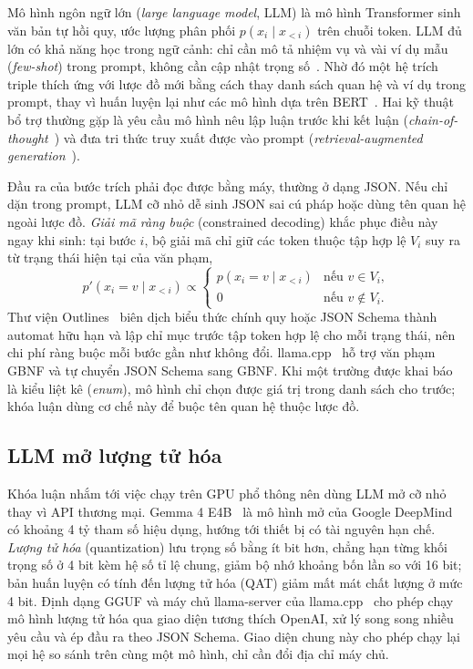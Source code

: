 Mô hình ngôn ngữ lớn (\textit{large language model}, LLM) là mô hình Transformer sinh văn bản tự hồi quy, ước lượng phân phối $p(x_i \mid x_{<i})$ trên chuỗi token.
LLM đủ lớn có khả năng học trong ngữ cảnh: chỉ cần mô tả nhiệm vụ và vài ví dụ mẫu (\textit{few-shot}) trong prompt, không cần cập nhật trọng số~\cite{brown2020gpt3}.
Nhờ đó một hệ trích triple thích ứng với lược đồ mới bằng cách thay danh sách quan hệ và ví dụ trong prompt, thay vì huấn luyện lại như các mô hình dựa trên BERT~\cite{devlin2019bert}.
Hai kỹ thuật bổ trợ thường gặp là yêu cầu mô hình nêu lập luận trước khi kết luận (\textit{chain-of-thought}~\cite{wei2022cot}) và đưa tri thức truy xuất được vào prompt (\textit{retrieval-augmented generation}~\cite{lewis2020rag}).

Đầu ra của bước trích phải đọc được bằng máy, thường ở dạng JSON.
Nếu chỉ dặn trong prompt, LLM cỡ nhỏ dễ sinh JSON sai cú pháp hoặc dùng tên quan hệ ngoài lược đồ.
\textit{Giải mã ràng buộc} (constrained decoding) khắc phục điều này ngay khi sinh: tại bước $i$, bộ giải mã chỉ giữ các token thuộc tập hợp lệ $V_i$ suy ra từ trạng thái hiện tại của văn phạm,
\begin{equation}
  p'(x_i = v \mid x_{<i}) \propto
  \begin{cases}
    p(x_i = v \mid x_{<i}) & \text{nếu } v \in V_i,\\
    0 & \text{nếu } v \notin V_i.
  \end{cases}
\end{equation}
Thư viện Outlines~\cite{willard2023outlines} biên dịch biểu thức chính quy hoặc JSON Schema thành automat hữu hạn và lập chỉ mục trước tập token hợp lệ cho mỗi trạng thái, nên chi phí ràng buộc mỗi bước gần như không đổi.
llama.cpp~\cite{llamacpp} hỗ trợ văn phạm GBNF và tự chuyển JSON Schema sang GBNF.
Khi một trường được khai báo là kiểu liệt kê (\textit{enum}), mô hình chỉ chọn được giá trị trong danh sách cho trước; khóa luận dùng cơ chế này để buộc tên quan hệ thuộc lược đồ.

\subsection{LLM mở lượng tử hóa}

Khóa luận nhắm tới việc chạy trên GPU phổ thông nên dùng LLM mở cỡ nhỏ thay vì API thương mại.
Gemma 4 E4B~\cite{gemma4} là mô hình mở của Google DeepMind có khoảng 4 tỷ tham số hiệu dụng, hướng tới thiết bị có tài nguyên hạn chế.
\textit{Lượng tử hóa} (quantization) lưu trọng số bằng ít bit hơn, chẳng hạn từng khối trọng số ở 4 bit kèm hệ số tỉ lệ chung, giảm bộ nhớ khoảng bốn lần so với 16 bit; bản huấn luyện có tính đến lượng tử hóa (QAT) giảm mất mát chất lượng ở mức 4 bit.
Định dạng GGUF và máy chủ llama-server của llama.cpp~\cite{llamacpp} cho phép chạy mô hình lượng tử hóa qua giao diện tương thích OpenAI, xử lý song song nhiều yêu cầu và ép đầu ra theo JSON Schema.
Giao diện chung này cho phép chạy lại mọi hệ so sánh trên cùng một mô hình, chỉ cần đổi địa chỉ máy chủ.

